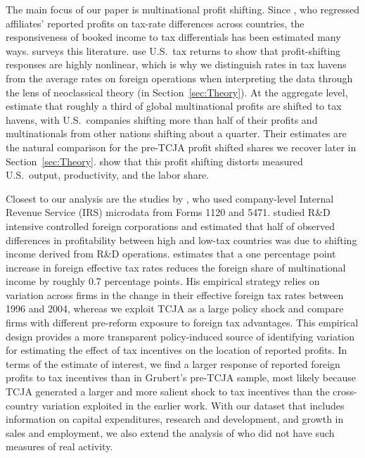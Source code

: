 \documentclass[11pt,letterpaper]{article}
\begin{document}
The main focus of our paper is multinational profit shifting. 
Since \citet{HinesRice1994}, who regressed affiliates' reported 
profits on tax-rate differences across countries, the responsiveness 
of booked income to tax differentials has been estimated many ways. 
\citet{Dharmapala2014} surveys this literature. \citet{DowdLandefeldMoore2017} 
use U.S.~tax returns to show that profit-shifting responses are highly
nonlinear, which is why we distinguish rates in tax havens from the average
rates on foreign operations when interpreting the data through the lens of
neoclassical theory (in Section~\ref{sec:Theory}).
At the aggregate level, \citet{TorslovWierZucman2023} estimate that 
roughly a third of global multinational profits are shifted to tax havens, 
with U.S.~companies shifting more than half of their profits and 
multinationals from other nations shifting about a quarter.
Their estimates are the natural comparison for the pre-TCJA profit shifted 
shares we recover later in Section~\ref{sec:Theory}.
\citet{GuvenenMataloniRassierRuhl2022} show that this profit shifting 
distorts measured U.S.~output, productivity, and the labor share. 

Closest to our analysis are the studies by \citet{Grubert2003,Grubert2012}, who used
company-level Internal Revenue Service (IRS) microdata from Forms 1120 and 5471.
\citet{Grubert2003} studied R\&D intensive controlled foreign corporations 
and estimated that half of observed differences in profitability between high 
and low-tax countries was due to shifting income derived from R\&D operations.
\citet{Grubert2012} estimates that a one percentage point increase in foreign effective 
tax rates reduces the foreign share of multinational income by roughly 0.7 percentage 
points.  His empirical strategy relies on variation across firms in the
change in their effective foreign tax rates between 1996 and 2004,
whereas we exploit TCJA as a 
large policy shock and compare firms with different pre-reform exposure to 
foreign tax advantages. This empirical design provides a more transparent
policy-induced source 
of identifying variation for estimating the effect of tax incentives on the 
location of reported profits.  In terms of the estimate of interest,
we find a larger response of reported foreign profits to tax incentives than in 
Grubert's pre-TCJA sample, most likely because TCJA generated a larger 
and more salient shock to tax incentives than the cross-country variation exploited
in the earlier work. With our dataset that includes information on capital expenditures,
research and development, and growth in sales and employment, we also
extend the analysis of \citet{Grubert2012} who did not have such measures
of real activity.
\end{document}
